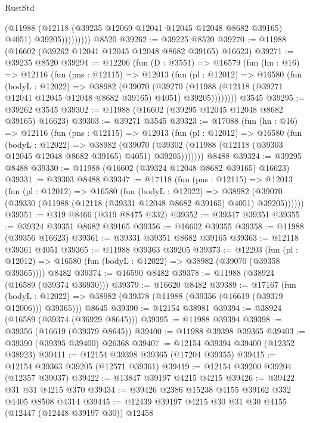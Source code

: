\begin{lexlean}{RustStd}
\begin{coremodule}
                    (@11988
                      (@12118 (@39235 @12069 @12041 @12045 @12048 @8682 @39165) @4051)
                      @39205)))))))))
    @8520
@39262 := @39225 @8520
@39270 := @11988 (@16602 (@39262 @12041 @12045 @12048 @8682 @39165) @16623)
@39271 := @39235 @8520
@39294 := @12206
    (fun (D : @3551) =>
    @16579
      (fun (hn : @16) =>
      @12116
        (fun (pns : @12115) =>
        @12013
          (fun (pl : @12012) =>
          @16580
            (fun (bodyL : @12022) =>
            @38982
              (@39070
                (@39270
                  (@11988 (@12118 (@39271 @12041 @12045 @12048 @8682 @39165) @4051) @39205))))))))
    @3545
@39295 := @39262 @3545
@39302 := @11988 (@16602 (@39295 @12045 @12048 @8682 @39165) @16623)
@39303 := @39271 @3545
@39323 := @17088
    (fun (hn : @16) =>
    @12116
      (fun (pns : @12115) =>
      @12013
        (fun (pl : @12012) =>
        @16580
          (fun (bodyL : @12022) =>
          @38982
            (@39070 (@39302 (@11988 (@12118 (@39303 @12045 @12048 @8682 @39165) @4051) @39205)))))))
    @8488
@39324 := @39295 @8488
@39330 := @11988 (@16602 (@39324 @12048 @8682 @39165) @16623)
@39331 := @39303 @8488
@39347 := @17118
    (fun (pns : @12115) =>
    @12013
      (fun (pl : @12012) =>
      @16580
        (fun (bodyL : @12022) =>
        @38982 (@39070 (@39330 (@11988 (@12118 (@39331 @12048 @8682 @39165) @4051) @39205))))))
@39351 := @319 @8466 (@319 @8475 @332)
@39352 := @39347 @39351
@39355 := @39324 @39351 @8682 @39165
@39356 := @16602 @39355
@39358 := @11988 (@39356 @16623)
@39361 := @39331 @39351 @8682 @39165
@39363 := @12118 @39361 @4051
@39365 := @11988 @39363 @39205
@39373 := @12203
    (fun (pl : @12012) => @16580 (fun (bodyL : @12022) => @38982 (@39070 (@39358 @39365))))
    @8482
@39374 := @16590 @8482
@39378 := @11988 (@38924 (@16589 (@39374 @36930)))
@39379 := @16620 @8482
@39389 := @17167
    (fun (bodyL : @12022) => @38982 (@39378 (@11988 (@39356 (@16619 (@39379 @12006))) @39365)))
    @8645
@39390 := @12154 @38981
@39394 := @38924 (@16589 (@39374 (@36929 @8645)))
@39395 := @11988 @39394
@39398 := @39356 (@16619 (@39379 @8645))
@39400 := @11988 @39398 @39365
@39403 := @39390 (@39395 @39400) @26368
@39407 := @12154 @39394 @39400 (@12352 @38923)
@39411 := @12154 @39398 @39365 (@17204 @39355)
@39415 := @12154 @39363 @39205 (@12571 @39361)
@39419 := @12154 @39200 @39204 (@12357 @39037)
@39422 := @13847 @39197 @4215 @4215
@39426 := @39422 @31 @31 @4215 @370
@39434 := @39426 @2386 @15238 @4155 @39162 @332 @4405 @8508 @4314
@39445 := @12439 @39197 @4215 @30 @31 @30 @4155 (@12447 (@12448 @39197 @30)) @12458

\end{coremodule}
\end{lexlean}
